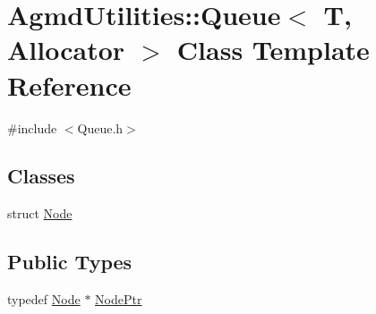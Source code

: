 \hypertarget{class_agmd_utilities_1_1_queue}{\section{Agmd\+Utilities\+:\+:Queue$<$ T, Allocator $>$ Class Template Reference}
\label{class_agmd_utilities_1_1_queue}
}


{\ttfamily \#include $<$Queue.\+h$>$}

\subsection*{Classes}
\begin{DoxyCompactItemize}
\item 
struct \hyperlink{struct_agmd_utilities_1_1_queue_1_1_node}{Node}
\end{DoxyCompactItemize}
\subsection*{Public Types}
\begin{DoxyCompactItemize}
\item 
typedef \hyperlink{struct_agmd_utilities_1_1_queue_1_1_node}{Node} $\ast$ \hyperlink{class_agmd_utilities_1_1_queue_a4f780cdae34486c3b145e16069bcf9fb}{Node\+Ptr}
\end{DoxyCompactItemize}
